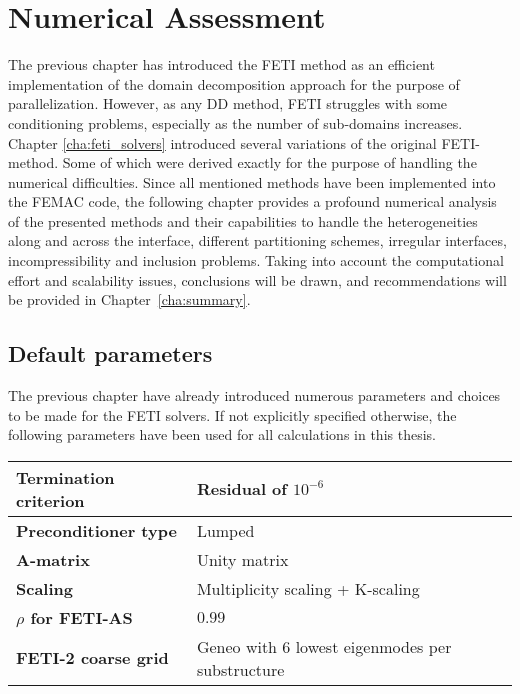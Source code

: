 \chapter{Numerical Assessment}\label{cha:numerical_assesment}
The previous chapter has introduced the FETI method as an efficient implementation of the domain decomposition approach for the purpose of parallelization. However, as any DD method, FETI struggles with some conditioning problems, especially as the number of sub-domains increases.\\
Chapter \ref{cha:feti_solvers} introduced several variations of the original FETI-method. Some of which were derived exactly for the purpose of handling the numerical difficulties. Since all mentioned methods have been implemented into the FEMAC code\cite{FEMAC}, the following chapter provides a profound numerical analysis of the presented methods and their capabilities to handle the heterogeneities along and across the interface, different partitioning schemes, irregular interfaces, incompressibility and inclusion problems. Taking into account the computational effort and scalability issues, conclusions will be drawn, and recommendations will be provided in Chapter~\ref{cha:summary}.
\\
\section{Default parameters}\label{sec:default_parameters}
The previous chapter have already introduced numerous parameters and choices to be made for the FETI solvers. If not explicitly specified otherwise, the following parameters have been used for all calculations in this thesis.
\\
\begin{center}
  \begin{tabular}{|l|l|}
    \hline
    \textbf{Termination criterion} &Residual of $10^{-6}$ \\
    \hline
    \textbf{Preconditioner type}   & Lumped                                               \\
    \hline
    \textbf{A-matrix}              & Unity matrix                                         \\
    \hline
    \textbf{Scaling}               & Multiplicity scaling                                 + K-scaling \\
    \hline
    \textbf{$\rho$ for FETI-AS}    & $0.99$                                               \\
    \hline
    \textbf{FETI-2 coarse grid}    & Geneo with 6 lowest eigenmodes per substructure                            \\
    \hline
  \end{tabular}
\end{center}


